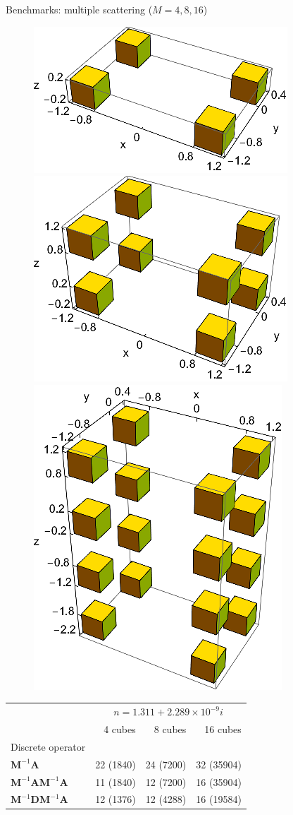 \documentclass[12pt]{beamer}
\begin{document}
\begin{frame}{\normalsize{Benchmarks: multiple scattering ($M=4, 8, 16$)}}
    \begin{figure}
    \centering
    \includegraphics[width = 0.31 \textwidth]{Figures/4cubes.png}
    \hfill
    \includegraphics[width = 0.31 \textwidth]{Figures/8cubes.png}
    \hfill
    \includegraphics[width = 0.31 \textwidth]{Figures/16cubes.png}
\end{figure}

\begin{footnotesize}
\begin{table}
\centering
\begin{tabular}{lrrr}
\toprule
& \multicolumn{3}{c}{$n=1.311 + 2.289 \times 10^{-9}i$} \\
\cmidrule{2-4} 
& 4 cubes &  8 cubes & 16 cubes  \\
\midrule
Discrete operator   &   &  & \\
$\mathbf{M}^{-1} \mathbf{A}$ &22 (1840) &24 (7200) &32 (35904)  \\
$\mathbf{M}^{-1} \mathbf{A}\mathbf{M}^{-1} \mathbf{A}$ &11 (1840) &12 (7200) &16 (35904)   \\
$\mathbf{M}^{-1} \mathbf{D}\mathbf{M}^{-1} \mathbf{A}$ &12 (1376) &12 (4288) &16 (19584) \\
\bottomrule
\end{tabular}
\end{table}
\end{footnotesize}
\end{frame}
\end{document}
